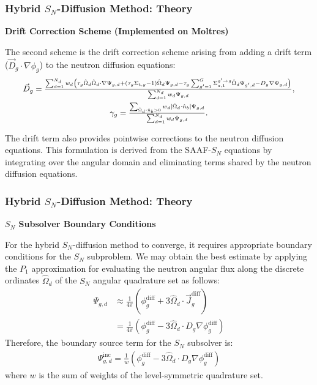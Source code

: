 \begin{frame}
  \frametitle{Hybrid $S_N$-Diffusion Method: Theory}
  \textbf{Drift Correction Scheme (Implemented on Moltres)}
  \vspace{.2cm}

  The second scheme is the drift correction scheme arising from adding a drift term
  ($\vec{D}_g\cdot\nabla \phi_g$) to the neutron diffusion equations:
  \begin{gather}
  \scalebox{0.95}{$
    \vec{D}_g = \frac{\sum^{N_d}_{d=1}w_d\left(\tau_g\hat{\Omega}_d\hat{\Omega}_d\cdot\nabla\Psi_{g,d}
    + \left(\tau_g\Sigma_{t,g}-1\right)\hat{\Omega}_d\Psi_{g,d}
    - \tau_g\sum^G_{g'=1}\Sigma^{g'\rightarrow g}_{s,1}\hat{\Omega}_d\Psi_{g',d}
- D_g\nabla\Psi_{g,d}\right)}{\sum^{N_d}_{d=1}w_d\Psi_{g,d}},$} \label{eq:drift} \\
  \scalebox{0.95}{$
    \gamma_g =
    \frac{\sum_{\hat{\Omega}_d\cdot\hat{n}_b > 0}w_d |\hat{\Omega}_d\cdot\hat{n}_b |
  \Psi_{g,d}}{\sum^{N_d}_{d=1}w_d\Psi_{g,d}}.$} \label{eq:bound-coef}
  \end{gather}
  \vspace{.2cm}

  The drift term also provides pointwise corrections to the neutron diffusion equations. This
  formulation is derived from the SAAF-$S_N$ equations by integrating over the angular domain and
  eliminating terms shared by the neutron diffusion equations.
\end{frame}

\begin{frame}
  \frametitle{Hybrid $S_N$-Diffusion Method: Theory}
  \textbf{$S_N$ Subsolver Boundary Conditions}
  \vspace{.2cm}

  For the hybrid $S_N$-diffusion method to converge, it requires appropriate boundary conditions for
  the $S_N$ subproblem.
  We may obtain
  the best estimate by applying the $P_1$ approximation for evaluating the neutron angular flux along
  the discrete ordinates $\hat{\Omega}_d$ of the $S_N$ angular quadrature set as follows:
  \begin{align}
    \Psi_{g,d} &\approx \frac{1}{4\pi}\left(\phi^\text{diff}_g+3\hat{\Omega}_d\cdot
    \vec{J}^\text{diff}_g\right) \nonumber \\
    &=\frac{1}{4\pi}\left(\phi^\text{diff}_g-3\hat{\Omega}_d\cdot D_g\nabla\phi^\text{diff}_g\right)
  \end{align}
  Therefore, the boundary source term for the $S_N$ subsolver is:
  \begin{gather}
    \Psi^\text{inc}_{g,d} = \frac{1}{w}
    \left(\phi^\text{diff}_g-3\hat{\Omega}_d\cdot D_g\nabla\phi^\text{diff}_g\right)
  \end{gather}
  where $w$ is the sum of weights of the level-symmetric quadrature set.
\end{frame}

